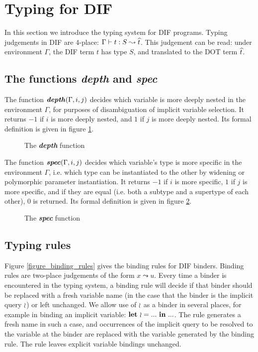\section{Typing for DIF}

In this section we introduce the typing system for DIF programs. Typing
judgements in DIF are 4-place: $\Gamma \vdash t: S \leadsto \widehat{t}$. This judgement can
be read: under environment $\Gamma$, the DIF term $t$ has type $S$, and
translated to the DOT term $\widehat{t}$.

\subsection{The functions \textit{depth} and \textit{spec}}

The function $\textbf{\textit{depth}}(\Gamma, i, j)$ decides which variable is more deeply nested
in the environment $\Gamma$, for purposes of disambiguation of implicit variable
selection. It returns $-1$ if $i$ is more deeply nested, and $1$ if $j$ is more
deeply nested. Its formal definition is given in figure \ref{figure_depth}.

\begin{figure}[h]
    
    \caption{The \textbf{\textit{depth}} function}
    \label{figure_depth}
\end{figure}

The function $\textbf{\textit{spec}}(\Gamma, i, j)$ decides which variable's type is more
specific in the environment $\Gamma$, i.e. which type can be instantiated to the
other by widening or polymorphic parameter instantiation. It returns $-1$ if $i$
is more specific, $1$ if $j$ is more specific, and if they are equal (i.e. both
a subtype and a supertype of each other), 0 is returned. Its formal definition
is given in figure \ref{figure_spec}.

\begin{figure}[h]
    
    \caption{The \textbf{\textit{spec}} function}
    \label{figure_spec}
\end{figure}

\subsection{Typing rules}

Figure \ref{figure_binding_rules} gives the binding rules for DIF binders.
Binding rules are two-place judgements of the form $x \leadsto u$. Every time a
binder is encountered in the typing system, a binding rule will decide if that
binder should be replaced with a fresh variable name (in the case that the
binder is the implicit query $\wr$) or left unchanged. We allow use of $\wr$
as a binder in several places, for example in binding an implicit variable:
$\textbf{let}\ \wr = ...\ \textbf{in}\ ...$. The rule  generates a fresh name in such a
case, and occurrences of the implicit query to be resolved to the variable at
the binder are replaced with the variable generated by the binding rule. The
rule  leaves explicit variable bindings unchanged.


